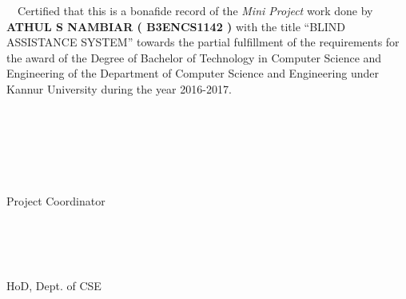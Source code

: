 \jadafont
  {~~Certified that this  is a bonafide record of the {\em Mini Project} work done by {\bf ATHUL S NAMBIAR (  
  {B3ENCS1142} )} with the title ``{{\sc \large BLIND ASSISTANCE SYSTEM}}'' towards the partial fulfillment of the 
  requirements for the award of the Degree of Bachelor of Technology in Computer Science and Engineering of the 
  Department of Computer Science and Engineering under Kannur University during the year 2016-2017.
  }
  
\vspace{3cm}
\hspace*{-.5in}
\parbox{2.5in}{
 \\
}
 \parbox{1.5in}{
 \noindent {\bf } \\
 }
\parbox{2.5in}{
\noindent  \\ 
 \\
\noindent Project Coordinator\\
}
\vspace*{3cm}

\parbox{1.5in}{
	\noindent {\bf } \\
}
\hspace{05.10cm}
\parbox{2.5in}{
	\noindent  \\ 
	 \\
	\noindent HoD, Dept. of CSE\\
}
\parskip 8pt
\clearpage
